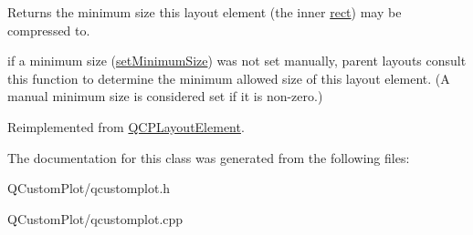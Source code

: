 Returns the minimum size this layout element (the inner \mbox{\hyperlink{class_q_c_p_layout_element_a208effccfe2cca4a0eaf9393e60f2dd4}{rect}}) may be compressed to.

if a minimum size (\mbox{\hyperlink{class_q_c_p_layout_element_a5dd29a3c8bc88440c97c06b67be7886b}{set\+Minimum\+Size}}) was not set manually, parent layouts consult this function to determine the minimum allowed size of this layout element. (A manual minimum size is considered set if it is non-\/zero.) 

Reimplemented from \mbox{\hyperlink{class_q_c_p_layout_element_ab3fdb5c9a5189bb2dac10d4d25329cd8}{Q\+C\+P\+Layout\+Element}}.



The documentation for this class was generated from the following files\+:\begin{DoxyCompactItemize}
\item 
Q\+Custom\+Plot/qcustomplot.\+h\item 
Q\+Custom\+Plot/qcustomplot.\+cpp\end{DoxyCompactItemize}
